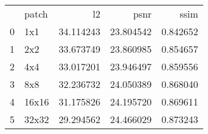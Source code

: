 \begin{tabular}{llrrr}
 & patch & l2 & psnr & ssim \\
0 & 1x1 & 34.114243 & 23.804542 & 0.842652 \\
1 & 2x2 & 33.673749 & 23.860985 & 0.854657 \\
2 & 4x4 & 33.017201 & 23.946497 & 0.859556 \\
3 & 8x8 & 32.236732 & 24.050389 & 0.868040 \\
4 & 16x16 & 31.175826 & 24.195720 & 0.869611 \\
5 & 32x32 & 29.294562 & 24.466029 & 0.873243 \\
\end{tabular}

